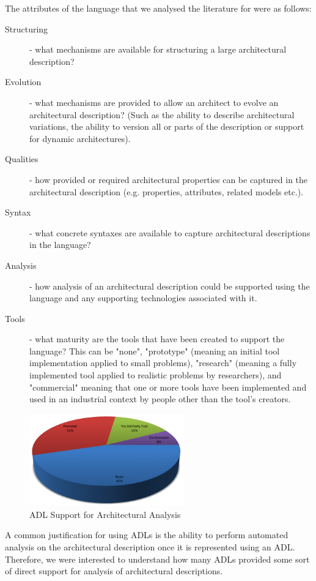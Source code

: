 The attributes of the language that we analysed the literature for were as follows:
\begin{description} 
	\item[Structuring] - what mechanisms are available for structuring a large architectural description?
	\item[Evolution] - what mechanisms are provided to allow an architect to evolve an architectural description?  (Such as the ability to describe architectural variations, the ability to version all or parts of the description or support for dynamic architectures).
	\item[Qualities] - how provided or required architectural properties can be captured in the architectural description (e.g. properties, attributes, related models etc.).
	\item[Syntax] - what concrete syntaxes are available to capture architectural descriptions in the language?
	\item[Analysis] - how analysis of an architectural description could be supported using the language and any supporting technologies associated with it.
	\item[Tools] - what maturity are the tools that have been created to support the language? This can be "none", "prototype" (meaning an initial tool implementation applied to small problems), "research" (meaning a fully implemented tool applied to realistic problems by researchers), and "commercial" meaning that one or more tools have been implemented and used in an industrial context by people other than the tool's creators.
\end{description}

\begin{figure}
\centering
\includegraphics[width=0.6\textwidth]{Figures/litreview-adl-analysis}
\caption{ADL Support for Architectural Analysis}
\label{figure:litreview-adl-analysis}
\end{figure}

A common justification for using ADLs is the ability to perform automated analysis on the architectural description once it is represented using an ADL.  Therefore, we were interested to understand how many ADLs provided some sort of direct support for analysis of architectural descriptions.  

